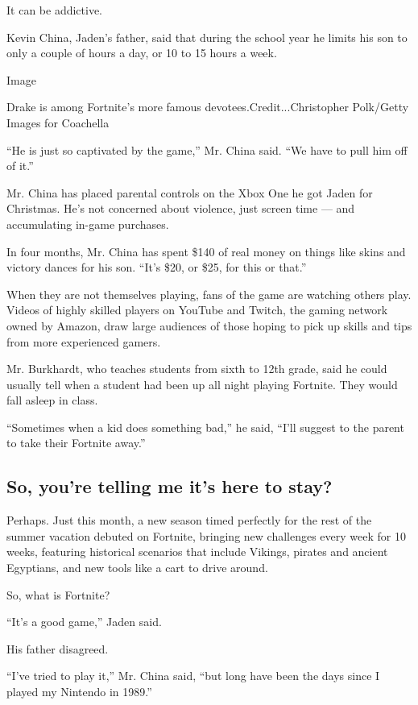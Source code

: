 It can be addictive.

Kevin China, Jaden's father, said that during the school year he limits
his son to only a couple of hours a day, or 10 to 15 hours a week.

Image

Drake is among Fortnite's more famous devotees.Credit...Christopher
Polk/Getty Images for Coachella

``He is just so captivated by the game,'' Mr. China said. ``We have to
pull him off of it.''

Mr. China has placed parental controls on the Xbox One he got Jaden for
Christmas. He's not concerned about violence, just screen time --- and
accumulating in-game purchases.

In four months, Mr. China has spent \$140 of real money on things like
skins and victory dances for his son. ``It's \$20, or \$25, for this or
that.''

When they are not themselves playing, fans of the game are watching
others play. Videos of highly skilled players on YouTube and Twitch, the
gaming network owned by Amazon, draw large audiences of those hoping to
pick up skills and tips from more experienced gamers.

Mr. Burkhardt, who teaches students from sixth to 12th grade, said he
could usually tell when a student had been up all night playing
Fortnite. They would fall asleep in class.

``Sometimes when a kid does something bad,'' he said, ``I'll suggest to
the parent to take their Fortnite away.''

\hypertarget{so-youre-telling-me-its-here-to-stay}{%
\subsection{So, you're telling me it's here to
stay?}\label{so-youre-telling-me-its-here-to-stay}}

Perhaps. Just this month, a new season timed perfectly for the rest of
the summer vacation debuted on Fortnite, bringing new challenges every
week for 10 weeks, featuring historical scenarios that include Vikings,
pirates and ancient Egyptians, and new tools like a cart to drive
around.

So, what is Fortnite?

``It's a good game,'' Jaden said.

His father disagreed.

``I've tried to play it,'' Mr. China said, ``but long have been the days
since I played my Nintendo in 1989.''

